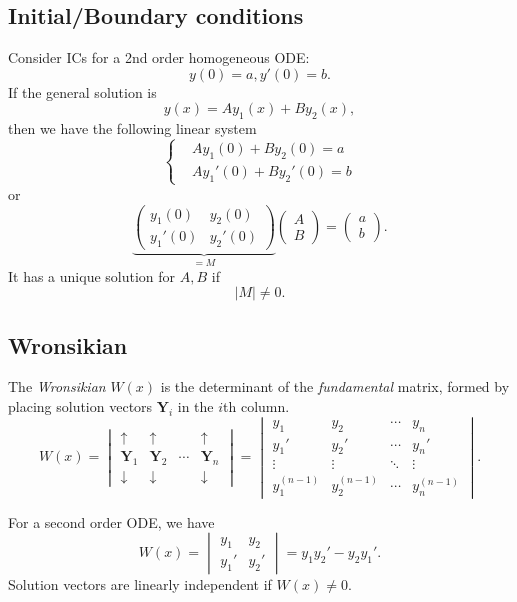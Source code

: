 \documentclass[10pt]{article}
\def\B{{\mathrm B}}
\begin{document}
    \subsection{Initial/Boundary conditions}
    Consider ICs for a 2nd order homogeneous ODE: 
    \[
        y(0)=a, y'(0)=b
    .\]
    If the general solution is 
    \[
        y(x)=Ay_1(x)+By_2(x)
    ,\]
    then we have the following linear system 
    \[
        \left\{ \begin{aligned}
            &Ay_1(0)+By_2(0)=a\\
            &Ay_1'(0)+By_2'(0)=b
        \end{aligned}\right.  
    \]
    or
    \[
        \underbrace{\begin{pmatrix}
            y_1(0)&y_2(0)\\
            y_1'(0)&y_2'(0)
        \end{pmatrix}}_{=M}
        \begin{pmatrix}
            A\\B
        \end{pmatrix}
        =
        \begin{pmatrix}
            a\\b
        \end{pmatrix}
    .\]
    It has a unique solution for $A,B$ if 
    \[
        |M|\neq 0
    .\] 
    \newpage
    \subsection{Wronsikian}
    \begin{definition}
        The \textit{Wronsikian} $ W(x) $ is the determinant of the \textit{fundamental} matrix, formed by placing solution vectors $ \mathbf{Y}_i $ in the $i$th column.
        \[
            W(x)=
            \begin{vmatrix}
                \uparrow &\uparrow &&\uparrow \\
                \mathbf{Y}_1&\mathbf{Y}_2&\cdots & \mathbf{Y}_n\\
                \downarrow & \downarrow & &  \downarrow
            \end{vmatrix}=
            \begin{vmatrix}y_{1}&y_{2}&\cdots &y_{n}\\y_{1}'&y_{2}'&\cdots &y_{n}'\\\vdots &\vdots &\ddots &\vdots \\y_{1}^{{(n-1)}}&y_{2}^{{(n-1)}}&\cdots &y_{n}^{{(n-1)}}\end{vmatrix}
        .\]
    \end{definition}
    For a second order ODE, we have 
    \begin{equation}\label{eq:12.4}
        W(x)=\begin{vmatrix}
            y_1&y_2\\
            y_1'&y_2'
        \end{vmatrix}=y_1y_2'-y_2y_1'.
    \end{equation}
    Solution vectors are linearly independent if $W(x)\neq 0$.
\end{document}
